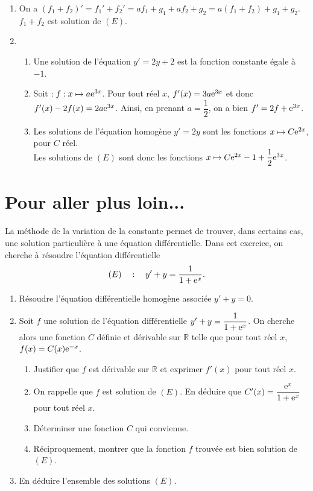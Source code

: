 \documentclass[11pt,fleqn, openany]{book} %
\begin{document}
\begin{solution} \hspace{0pt}
\begin{enumerate} \item On a $(f_1+f_2)'=f_1'+f_2'=af_1+g_1+af_2+g_2=a(f_1+f_2)+g_1+g_2$.  \(f_1+f_2\) est solution de \((E)\).
\item \begin{enumerate}\item Une solution de l'équation $y'=2y+2$ est la fonction constante égale à $-1$.
\item Soit $:f:x\mapsto a\mathrm{e}^{3x}$. Pour tout réel $x$, $f'(x)=3a\mathrm{e}^{3x}$ et donc $f'(x)-2f(x)=2a\mathrm{e}^{3x}$. Ainsi, en prenant $a=\dfrac{1}{2}$, on a bien $f'=2f+\mathrm{e}^{3x}$.
\item Les solutions de l'équation homogène $y'=2y$ sont les fonctions $x \mapsto C\mathrm{e}^{2x}$, pour $C$ réel. \\ Les solutions de $(E)$ sont donc les fonctions $x\mapsto C\mathrm{e}^{2x}-1+\dfrac{1}{2}\mathrm{e}^{3x}$.\end{enumerate}\end{enumerate}
\end{solution}




\section*{Pour aller plus loin...}


\begin{exercise}[subtitle={(Variation de la constante)}] La méthode de la variation de la constante permet de trouver, dans certains cas, une solution particulière à une équation différentielle. Dans cet exercice, on cherche à résoudre l'équation différentielle 
\[(E)\quad : \quad y'+y=\dfrac{1}{1+\mathrm{e}^x}.\]
\begin{enumerate}
\item Résoudre l'équation différentielle homogène associée $y'+y=0$.
\item Soit $f$ une solution de l'équation différentielle $y'+y=\dfrac{1}{1+\mathrm{e}^x}$. On cherche alors une fonction $C$ définie et dérivable sur $\mathbb{R}$ telle que pour tout réel $x$, $f(x)=C(x)\mathrm{e}^{-x}$.
\vskip5pt
\begin{enumerate}
\item Justifier que $f$ est dérivable sur $\mathbb{R}$ et exprimer $f'(x)$ pour tout réel $x$.
\item On rappelle que $f$ est solution de $(E)$. En déduire que $C'(x)=\dfrac{\mathrm{e}^x}{1+\mathrm{e}^x}$ pour tout réel $x$.
\item Déterminer une fonction $C$ qui convienne.
\item Réciproquement, montrer que la fonction $f$ trouvée est bien solution de $(E)$.
\end{enumerate}
\item En déduire l'ensemble des solutions $(E)$.
\end{enumerate}\end{exercise}
\end{document}
